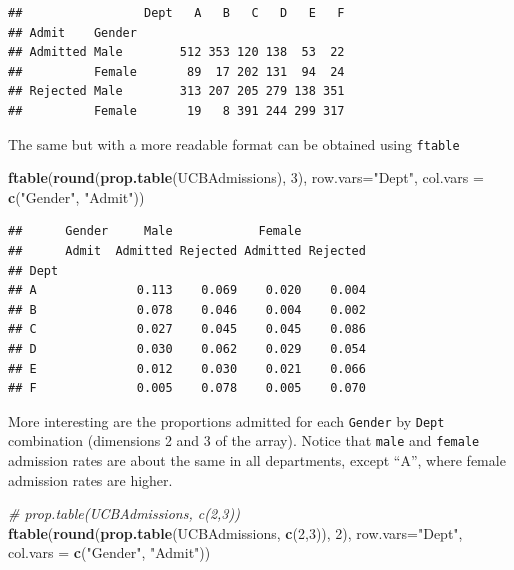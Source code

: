 \documentclass[]{article}
\newenvironment{Shaded}{\begin{snugshade}}{\end{snugshade}}
\newcommand{\KeywordTok}[1]{\textcolor[rgb]{0.13,0.29,0.53}{\textbf{{#1}}}}
\newcommand{\DataTypeTok}[1]{\textcolor[rgb]{0.13,0.29,0.53}{{#1}}}
\newcommand{\DecValTok}[1]{\textcolor[rgb]{0.00,0.00,0.81}{{#1}}}
\newcommand{\StringTok}[1]{\textcolor[rgb]{0.31,0.60,0.02}{{#1}}}
\newcommand{\CommentTok}[1]{\textcolor[rgb]{0.56,0.35,0.01}{\textit{{#1}}}}
\newcommand{\NormalTok}[1]{{#1}}
\numberwithin{equation}{section}
\begin{document}
\begin{verbatim}
##                 Dept   A   B   C   D   E   F
## Admit    Gender                             
## Admitted Male        512 353 120 138  53  22
##          Female       89  17 202 131  94  24
## Rejected Male        313 207 205 279 138 351
##          Female       19   8 391 244 299 317
\end{verbatim}

The same but with a more readable format can be obtained using
\texttt{ftable}

\begin{Shaded}
\begin{Highlighting}[]
\KeywordTok{ftable}\NormalTok{(}\KeywordTok{round}\NormalTok{(}\KeywordTok{prop.table}\NormalTok{(UCBAdmissions), }\DecValTok{3}\NormalTok{),}
       \DataTypeTok{row.vars=}\StringTok{"Dept"}\NormalTok{, }\DataTypeTok{col.vars =} \KeywordTok{c}\NormalTok{(}\StringTok{"Gender"}\NormalTok{, }\StringTok{"Admit"}\NormalTok{))}
\end{Highlighting}
\end{Shaded}

\begin{verbatim}
##      Gender     Male            Female         
##      Admit  Admitted Rejected Admitted Rejected
## Dept                                           
## A              0.113    0.069    0.020    0.004
## B              0.078    0.046    0.004    0.002
## C              0.027    0.045    0.045    0.086
## D              0.030    0.062    0.029    0.054
## E              0.012    0.030    0.021    0.066
## F              0.005    0.078    0.005    0.070
\end{verbatim}

More interesting are the proportions admitted for each \texttt{Gender}
by \texttt{Dept} combination (dimensions 2 and 3 of the array). Notice
that \texttt{male} and \texttt{female} admission rates are about the
same in all departments, except ``A'', where female admission rates are
higher.

\begin{Shaded}
\begin{Highlighting}[]
\CommentTok{# prop.table(UCBAdmissions, c(2,3))}
\KeywordTok{ftable}\NormalTok{(}\KeywordTok{round}\NormalTok{(}\KeywordTok{prop.table}\NormalTok{(UCBAdmissions, }\KeywordTok{c}\NormalTok{(}\DecValTok{2}\NormalTok{,}\DecValTok{3}\NormalTok{)), }\DecValTok{2}\NormalTok{),}
       \DataTypeTok{row.vars=}\StringTok{"Dept"}\NormalTok{, }\DataTypeTok{col.vars =} \KeywordTok{c}\NormalTok{(}\StringTok{"Gender"}\NormalTok{, }\StringTok{"Admit"}\NormalTok{))}
\end{Highlighting}
\end{Shaded}
\end{document}
